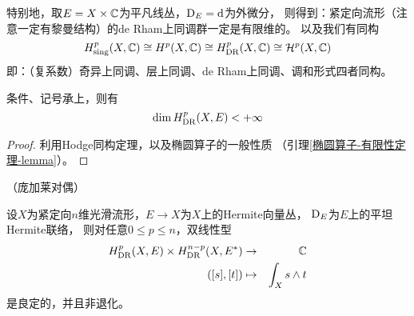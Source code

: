 
特别地，取$E=X\times\mathbb{C}$为平凡线丛，$\mathrm{D}_E=\mathrm{d}$为外微分，
则得到：紧定向流形（注意一定有黎曼结构）的de Rham上同调群一定是有限维的。
以及我们有同构
$$
  H^p_{\operatorname{sing}}(X,\mathbb{C})
\cong H^p(X,\mathbb{C})
\cong H^p_{\operatorname{DR}}(X,\mathbb{C})
\cong \mathcal{H}^p(X,\mathbb{C})
$$
即：（复系数）奇异上同调、层上同调、de Rham上同调、调和形式四者同构。

\begin{cor}条件、记号承上，则有
$$\dim H^{p}_{\operatorname{DR}}(X,E)<+\infty$$
\end{cor}

\begin{proof}
利用Hodge同构定理，以及椭圆算子的一般性质
（引理\ref{椭圆算子-有限性定理-lemma}）。
\end{proof}

\begin{thm}（庞加莱对偶）
\label{庞加莱对偶-thm}

设$X$为紧定向$n$维光滑流形，$E\to X$为$X$上的Hermite向量丛，
$\mathrm{D}_E$为$E$上的平坦Hermite联络，
则对任意$0\leq p\leq n$，双线性型
\begin{eqnarray*}
     H^p_{\operatorname{DR}}(X,E)\times H^{n-p}_{\operatorname{DR}}(X,E^*)&\to&\mathbb{C}\\
     ([s],[t])&\mapsto&\int_Xs\wedge t
\end{eqnarray*}
是良定的，并且非退化。
\end{thm}

